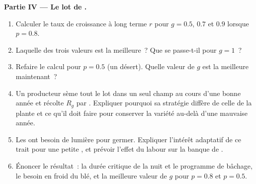 \begin{problem}
\medskip
\noindent\textbf{Partie IV --- Le lot de .}
\begin{enumerate}[resume]
  \item Calculer le taux de croissance à long terme $r$ pour $g = 0.5$,
        $0.7$ et $0.9$ lorsque $p = 0.8$.
  \item Laquelle des trois valeurs est la meilleure~? Que se passe-t-il
        pour $g = 1$~?
  \item Refaire le calcul pour $p = 0.5$ (un désert). Quelle valeur de
        $g$ est la meilleure maintenant~?
  \item Un producteur sème tout le lot dans un seul champ au cours d'une
        bonne année et récolte $R_g$  par . Expliquer pourquoi
        sa stratégie diffère de celle de la plante et ce qu'il doit faire
        pour conserver la variété au-delà d'une mauvaise année.
  \item Les  ont besoin de lumière pour germer. Expliquer l'intérêt
        adaptatif de ce trait pour une petite , et prévoir l'effet
        du labour sur la banque de .
  \item Énoncer le résultat~: la durée critique de la nuit et le
        programme de bâchage, le besoin en froid du blé, et la meilleure
        valeur de $g$ pour $p = 0.8$ et $p = 0.5$.
\end{enumerate}
\end{problem}

